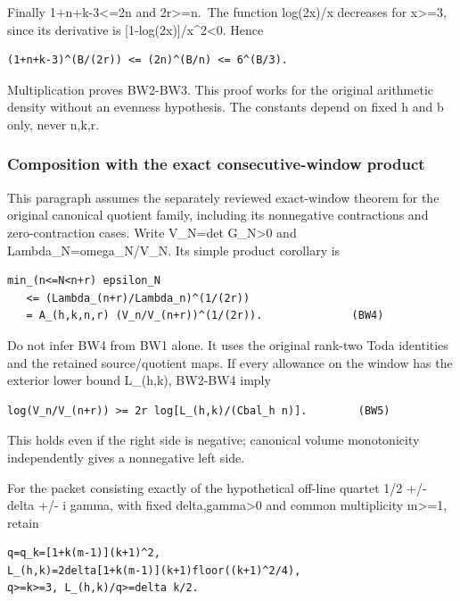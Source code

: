 Finally 1+n+k-3\textless=2n and 2r\textgreater=n.~The function log(2x)/x decreases for x\textgreater=3, since its derivative is {[}1-log(2x){]}/x\^{}2\textless0. Hence

\begin{verbatim}
(1+n+k-3)^(B/(2r)) <= (2n)^(B/n) <= 6^(B/3).
\end{verbatim}

Multiplication proves BW2-BW3. This proof works for the original arithmetic density without an evenness hypothesis. The constants depend on fixed h and b only, never n,k,r.

\subsubsection{Composition with the exact consecutive-window product}\label{endpoint-balanced_window--composition-with-the-exact-consecutive-window-product}

This paragraph assumes the separately reviewed exact-window theorem for the original canonical quotient family, including its nonnegative contractions and zero-contraction cases. Write V\_N=det G\_N\textgreater0 and Lambda\_N=omega\_N/V\_N. Its simple product corollary is

\begin{verbatim}
min_(n<=N<n+r) epsilon_N
   <= (Lambda_(n+r)/Lambda_n)^(1/(2r))
   = A_(h,k,n,r) (V_n/V_(n+r))^(1/(2r)).              (BW4)
\end{verbatim}

Do not infer BW4 from BW1 alone. It uses the original rank-two Toda identities and the retained source/quotient maps. If every allowance on the window has the exterior lower bound L\_(h,k), BW2-BW4 imply

\begin{verbatim}
log(V_n/V_(n+r)) >= 2r log[L_(h,k)/(Cbal_h n)].        (BW5)
\end{verbatim}

This holds even if the right side is negative; canonical volume monotonicity independently gives a nonnegative left side.

For the packet consisting exactly of the hypothetical off-line quartet 1/2 +/- delta +/- i gamma, with fixed delta,gamma\textgreater0 and common multiplicity m\textgreater=1, retain

\begin{verbatim}
q=q_k=[1+k(m-1)](k+1)^2,
L_(h,k)=2delta[1+k(m-1)](k+1)floor((k+1)^2/4),
q>=k>=3, L_(h,k)/q>=delta k/2.
\end{verbatim}

